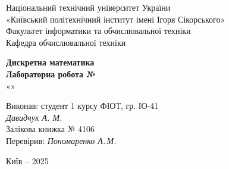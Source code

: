 \documentclass[12pt,a4paper]{article}
\begin{document}
    \begin{titlepage}

        \thispagestyle{empty}
        \begin{center}
        \large
        Національний технічний університет України\\
        «Київський політехнічний інститут імені Ігоря Сікорського»\\[1em]
        Факультет інформатики та обчислювальної техніки\\
        Кафедра обчислювальної техніки
        \end{center}

        \vfill

        \begin{center}
        \textbf{\LARGE Дискретна математика}\\[2em]
        \textbf{\Large Лабораторна робота №}\\
        «» 
        \end{center}

        \vfill

        \begin{flushright}
        Виконав: студент 1 курсу ФІОТ, гр. ІО-41\\
        \textit{Давидчук А. М.}\\
        Залікова книжка № 4106\\[1em]
        Перевірив: \textit{Пономаренко А.\,М.}
        \end{flushright}

        \vfill

        \begin{center}
        Київ -- 2025
        \end{center}

    \end{titlepage}

\end{document}
